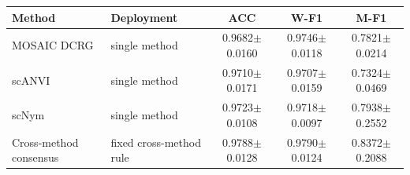 \begin{tabular}{p{3.5cm}p{3.1cm}ccc}
\toprule
Method & Deployment & ACC & W-F1 & M-F1 \\
\midrule
MOSAIC DCRG & single method & 0.9682$\pm$0.0160 & 0.9746$\pm$0.0118 & 0.7821$\pm$0.0214 \\
scANVI & single method & 0.9710$\pm$0.0171 & 0.9707$\pm$0.0159 & 0.7324$\pm$0.0469 \\
scNym & single method & 0.9723$\pm$0.0108 & 0.9718$\pm$0.0097 & 0.7938$\pm$0.2552 \\
Cross-method consensus & fixed cross-method rule & 0.9788$\pm$0.0128 & 0.9790$\pm$0.0124 & 0.8372$\pm$0.2088 \\
\bottomrule
\end{tabular}
